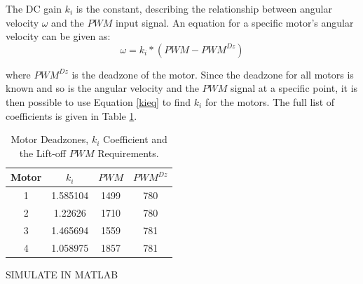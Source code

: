 The DC gain $k_i$ is the constant, describing the relationship between angular velocity $\omega$ and the $PWM$ input signal. An equation for a specific motor's angular velocity can be given as:
\begin{equation}
\label{kieq}
	\omega = k_i*(PWM - PWM^{Dz})
\end{equation}

where $PWM^{Dz}$ is the deadzone of the motor.
Since the deadzone for all motors is known and so is the angular velocity and the $PWM$ signal at a specific point, it is then possible to use Equation \ref{kieq} to find $k_i$ for the motors. The full list of coefficients is given in Table \ref{motorCoeffs}.

\begin{table}[H]
\centering
\begin{tabular}{|c|c|c|c|}
\hline
Motor	& $k_i$ 	& $PWM$ 	& $PWM^{Dz}$ 	\\ \hline
1 		& 1.585104	& 1499		& 780			\\ \hline
2 		& 1.22626	& 1710		& 780			\\ \hline
3 		& 1.465694	& 1559		& 781			\\ \hline
4 		& 1.058975	& 1857		& 781			\\ \hline

\end{tabular}
\caption{Motor Deadzones, $k_i$ Coefficient and the Lift-off $PWM$ Requirements.}
\label{motorCoeffs}
\end{table}

SIMULATE IN MATLAB